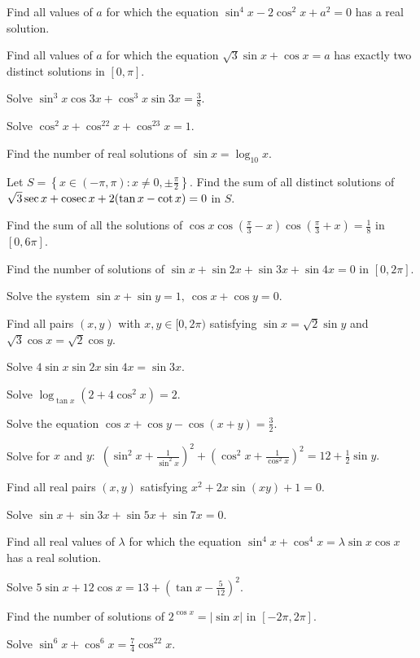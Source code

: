 \item Find all values of $a$ for which the equation $\sin^4x - 2\cos^2x + a^2 = 0$ has a real solution.
\item Find all values of $a$ for which the equation $\sqrt{3}\sin x + \cos x = a$ has exactly two distinct solutions in
    $[0, \pi].$
\item Solve $\sin^3x\cos3x + \cos^3x\sin3x = \frac{3}{8}.$
\item Solve $\cos^2x + \cos^22x + \cos^23x = 1.$
\item Find the number of real solutions of $\sin x = \log_{10}x.$
\item Let $S = \left\{x\in(-\pi, \pi): x\neq 0, \pm\frac{\pi}{2}\right\}.$ Find the sum of all distinct solutions of
    $\sqrt{3}\sec x + {\rm cosec}\,x + 2(\tan x - \cot x) = 0$ in $S.$
\item Find the sum of all the solutions of $\cos x\cos\left(\frac{\pi}{3} - x\right)\cos\left(\frac{\pi}{3} + x\right) =
    \frac{1}{8}$ in $[0, 6\pi].$
\item Find the number of solutions of $\sin x + \sin2x + \sin3x + \sin4x = 0$ in $[0, 2\pi].$
\item Solve the system $\sin x + \sin y = 1,~\cos x + \cos y = 0.$
\item Find all pairs $(x, y)$ with $x, y\in[0, 2\pi)$ satisfying $\sin x = \sqrt{2}\sin y$ and $\sqrt{3}\cos x =
    \sqrt{2}\cos y.$
\item Solve $4\sin x\sin2x\sin4x = \sin3x.$
\item Solve $\log_{\tan x}(2 + 4\cos^2x) = 2.$
\item Solve the equation $\cos x + \cos y - \cos(x + y) = \frac{3}{2}.$
\item Solve for $x$ and $y:$ $\left(\sin^2x + \frac{1}{\sin^2x}\right)^2 + \left(\cos^2x + \frac{1}{\cos^2x}\right)^2 = 12
    + \frac{1}{2}\sin y.$
\item Find all real pairs $(x, y)$ satisfying $x^2 + 2x\sin(xy) + 1 = 0.$
\item Solve $\sin x + \sin3x + \sin5x + \sin7x = 0.$
\item Find all real values of $\lambda$ for which the equation $\sin^4x + \cos^4x = \lambda\sin x\cos x$ has a real
    solution.
\item Solve $5\sin x + 12\cos x = 13 + \left(\tan x - \frac{5}{12}\right)^2.$
\item Find the number of solutions of $2^{\cos x} = |\sin x|$ in $[-2\pi, 2\pi].$
\item Solve $\sin^6x + \cos^6x = \frac{7}{4}\cos^22x.$
